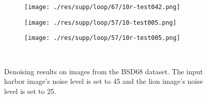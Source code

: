\documentclass{article} %
\begin{document}
\begin{figure}[htp!]
\begin{subfigure}[t]{0.22\textwidth}
		\centering
		\texttt{[image: ./res/supp/loop/67/10r-test042.png]}
	\end{subfigure}
	\hspace{2pt}
	\begin{subfigure}[t]{0.22\textwidth}
		\centering
		\texttt{[image: ./res/supp/loop/57/10-test005.png]}
	\end{subfigure}
	\begin{subfigure}[t]{0.22\textwidth}
		\centering
		\texttt{[image: ./res/supp/loop/57/10r-test005.png]}
	\end{subfigure}\\
	\caption{Denoising results on images from the BSD68 dataset.
	The input harbor image's noise level is set to 45 and the lion image's
	noise level is set to 25.}
	\label{loop}
\end{figure}
\end{document}
